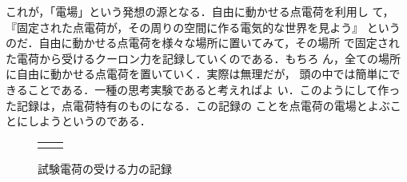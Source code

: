                 これが，「電場」という発想の源となる．自由に動かせる点電荷を利用し
                て，『固定された点電荷が，その周りの空間に作る電気的な世界を見よう』
                というのだ．自由に動かせる点電荷を様々な場所に置いてみて，その場所
                で固定された電荷から受けるクーロン力を記録していくのである．もちろ
                ん，全ての場所に自由に動かせる点電荷を置いていく．実際は無理だが，
                頭の中では簡単にできることである．一種の思考実験であると考えればよ
                い．このようにして作った記録は，点電荷特有のものになる．この記録の
                ことを点電荷の電場とよぶことにしようというのである．
                    \begin{figure}[hbt]
                        \begin{tabular}{cc}
                            \begin{minipage}{0.5\hsize}
                                \begin{center}
                                    {denba_intro.pdf}
                                    \caption{試験電荷の受ける力}
                                    \label{fig:siken_denka_ukerutikara}
                                \end{center}
                            \end{minipage}
                            \begin{minipage}{0.5\hsize}
                                \begin{center}
                                    {denba_intro2.pdf}
                                    \caption{試験電荷の受ける力の記録}
                                    \label{fig:denba_intro2}
                                \end{center}
                            \end{minipage}
                        \end{tabular}
                    \end{figure}

